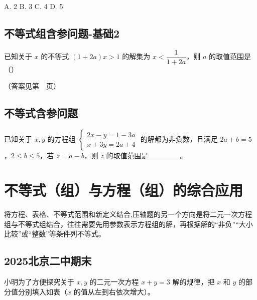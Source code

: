 A. 2 \quad B. 3 \quad C. 4 \quad D. 5

\vspace{3cm}

\subsection{不等式组含参问题-基础2}

已知关于 \(x\) 的不等式 \((1+2a)x > 1\) 的解集为 \(x < \dfrac{1}{1+2a}\)，则 \(a\) 的取值范围是（\hspace{1cm}）

\noindent
{}%
\hfill
{}%
\hfill
{}%
\hfill
{}

\vspace{3cm}

（答案见第~\pageref{不等式组含参问题-基础2}~页）

\subsection{不等式含参问题}

已知关于 \(x, y\) 的方程组 \(\begin{cases} 2x - y = 1 - 3a \\ x + 3y = 2a + 4 \end{cases}\) 的解都为非负数，且满足 \(2a + b = 5\)，\(2 \leq b \leq 5\)，若 \(z = a - b\)，则 \(z\) 的取值范围是\_\_\_\_\_\_。

\vspace{3cm}

\section{不等式（组）与方程（组）的综合应用}

将方程、表格、不等式范围和新定义结合,压轴题的另一个方向是将二元一次方程组与不等式组结合，往往需要先用参数表示方程组的解，再根据解的“非负”“大小比较”或“整数”等条件列不等式。




\subsection{2025北京二中期末}

小明为了方便探究关于 \(x, y\) 的二元一次方程 \(x+y=3\) 解的规律，把 \(x\) 和 \(y\) 的部分值分别填入如表（\(x\) 的值从左到右依次增大）。

